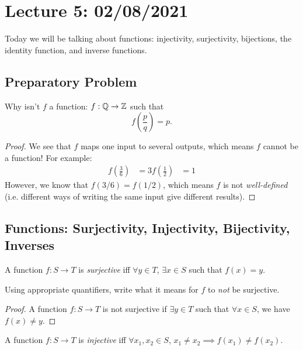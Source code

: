 \section{Lecture 5: 02/08/2021}

Today we will be talking about functions: injectivity, surjectivity, bijections, the identity function, and inverse functions.

\subsection{Preparatory Problem}

\begin{example}
Why isn't $f$ a function: $f : \mathbb{Q} \to \mathbb{Z}$ such that
\[
f\left(\frac p q \right) = p.
\]
\end{example}

\begin{proof}
We see that $f$ maps one input to several outputs, which means $f$ cannot be a function! For example:
\begin{align*}
    f\left(\frac 3 6 \right) &= 3
    f\left(\frac 1 2 \right) &= 1
\end{align*}
However, we know that $f(3/6) = f(1/2)$, which means $f$ is not \textit{well-defined} (i.e. different ways of writing the same input give different results).
\end{proof}

\subsection{Functions: Surjectivity, Injectivity, Bijectivity, Inverses}

\begin{definition}[Surjectivity]
A function $f : S \to T$ is \textit{surjective} iff $\forall y \in T$, $\exists x \in S$ such that $f(x) = y$.
\end{definition}

\begin{example}
Using appropriate quantifiers, write what it means for $f$ to \textit{not} be surjective.
\end{example}

\begin{proof}
A function $f : S \to T$ is not surjective if $\exists y \in T$ such that $\forall x \in S$, we have $f(x) \neq y$.
\end{proof}

\begin{definition}[Injectivity]
A function $f : S \to T$ is \textit{injective} iff $\forall x_1, x_2 \in S$, $x_1 \neq x_2 \implies f(x_1) \neq f(x_2)$.
\end{definition}

